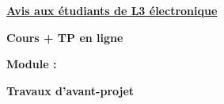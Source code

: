 \documentclass[12pt]{article}
\begin{document}
\vspace*{\fill}
\begin{center}
  {\fontsize{30}{36}\selectfont\bfseries
   \uline{Avis aux étudiants de L3 électronique}\par}

  \vspace{1.5cm}

  {\fontsize{72}{80}\selectfont\bfseries Cours + TP en ligne\par}

  \vspace{1.2cm}

  {\fontsize{48}{56}\selectfont\bfseries Module :\par}

  \vspace{0.6cm}

  {\setlength{\fboxsep}{10pt}%
   \colorbox{cyanvif}{\fontsize{54}{62}\selectfont\bfseries
     \hspace{0.6cm}Travaux d'avant-projet\hspace{0.6cm}}\par}
\end{center}
\vspace*{\fill}
\end{document}
